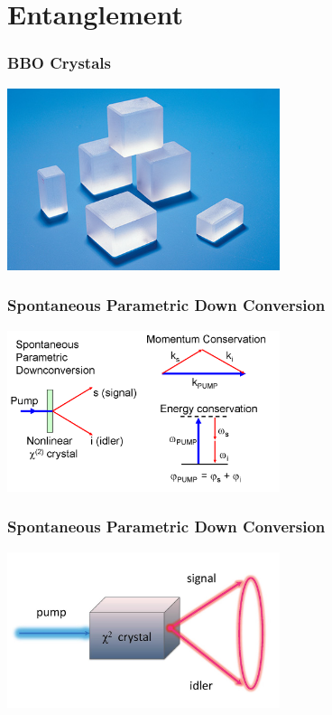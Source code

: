 \documentclass{beamer}
\begin{document}
\section{Entanglement}

\begin{frame}\frametitle{BBO Crystals}
\begin{center}
\includegraphics[width=8cm]{fig/BBOcrystal.jpg}
\end{center}
\end{frame}

\begin{frame}\frametitle{Spontaneous Parametric Down Conversion}
\begin{center}
\includegraphics[width=8cm]{fig/SPDC.png}
\end{center}
\end{frame}

\begin{frame}\frametitle{Spontaneous Parametric Down Conversion}
\begin{center}
\includegraphics[width=8cm]{fig/SPDC2.jpg}
\end{center}
\end{frame}
\end{document}
